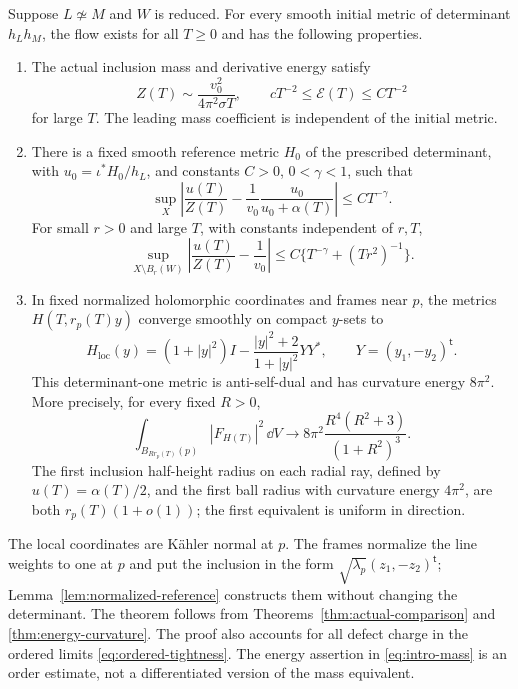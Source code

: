 \begin{theorem}\label{thm:main}
Suppose \(L\not\simeq M\) and \(W\) is reduced.
For every smooth initial metric of determinant
\(h_Lh_M\), the flow exists for all \(T\ge0\) and
has the following properties.
\begin{enumerate}
\item The actual inclusion mass and derivative energy satisfy
\begin{equation}\label{eq:intro-mass}
 Z(T)\sim\frac{v_0^2}{4\pi^2\sigma T},\qquad
 cT^{-2}\le\mathcal E(T)\le CT^{-2}
\end{equation}
for large \(T\). The leading mass coefficient is
independent of the initial metric.
\item There is a fixed smooth reference metric \(H_0\)
of the prescribed determinant, with
\(u_0=\iota^*H_0/h_L\), and constants \(C>0\),
\(0<\gamma<1\), such that
\begin{equation}\label{eq:intro-profile}
 \sup_X\left|\frac{u(T)}{Z(T)}
       -\frac1{v_0}\frac{u_0}{u_0+\alpha(T)}\right|
 \le CT^{-\gamma}.
\end{equation}
For small \(r>0\) and large \(T\), with constants
independent of \(r,T\),
\[
 \sup_{X\setminus B_r(W)}
 \left|\frac{u(T)}{Z(T)}-\frac1{v_0}\right|
 \le C\{T^{-\gamma}+(Tr^2)^{-1}\}.
\]
\item In fixed normalized holomorphic coordinates and
frames near \(p\), the metrics \(H(T,r_p(T)y)\)
converge smoothly on compact \(y\)-sets to
\begin{equation}\label{eq:intro-local-metric}
 H_{\mathrm{loc}}(y)
 =(1+|y|^2)I-\frac{|y|^2+2}{1+|y|^2}YY^*,
 \qquad Y=(y_1,-y_2)^{\mathsf t}.
\end{equation}
This determinant-one metric is anti-self-dual and
has curvature energy \(8\pi^2\). More precisely,
for every fixed \(R>0\),
\[
 \int_{B_{Rr_p(T)}(p)}|F_{H(T)}|^2\,\dd V
 \longrightarrow
 8\pi^2\frac{R^4(R^2+3)}{(1+R^2)^3}.
\]
The first inclusion half-height radius on each
radial ray, defined by \(u(T)=\alpha(T)/2\),
and the first ball radius with curvature energy
\(4\pi^2\), are both \(r_p(T)(1+o(1))\);
the first equivalent is uniform in direction.
\end{enumerate}
\end{theorem}

The local coordinates are Kähler normal at \(p\).
The frames normalize the line weights to one at \(p\)
and put the inclusion in the form
\(\sqrt{\lambda_p}(z_1,-z_2)^{\mathsf t}\);
Lemma~\ref{lem:normalized-reference} constructs them
without changing the determinant.
The theorem follows from
Theorems~\ref{thm:actual-comparison} and
\ref{thm:energy-curvature}.
The proof also accounts for all defect charge in
the ordered limits \eqref{eq:ordered-tightness}.
The energy assertion in \eqref{eq:intro-mass}
is an order estimate, not a differentiated version
of the mass equivalent.

